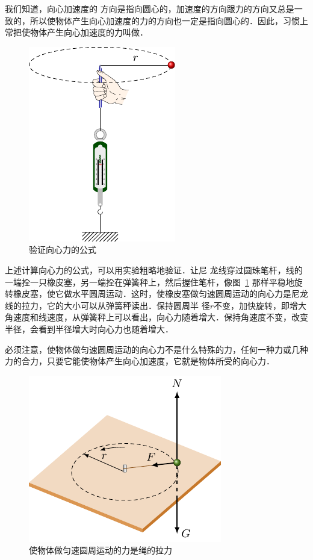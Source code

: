 我们知道，向心加速度的
方向是指向圆心的，加速度的方向跟力的方向又总是一致的，所以使物体产生向心加速度的力的方向也一定是指向圆心的．因此，习惯上常把使物体产生向心加速度的力叫做．

\begin{figure}[htbp]
    \centering
    \includegraphics{fig/A/4-20.pdf}
    \caption{验证向心力的公式}\label{fig_A_4-20}
\end{figure}


上述计算向心力的公式，可以用实验粗略地验证．让尼
龙线穿过圆珠笔杆，线的一端拴一只橡皮塞，另一端拴在弹簧秤上，然后握住笔杆，像图~\ref{fig_A_4-20} 那样平稳地旋转橡皮塞，使它做水平圆周运动．这时，使橡皮塞做匀速圆周运动的向心力是尼龙线的拉力，它的大小可以从弹簧秤读出．保持圆周半
径$r$不变，加快旋转，即增大角速度和线速度，从弹簧秤上可以看出，向心力随着增大．保持角速度不变，改变半径，会看到半径增大时向心力也随着增大．

必须注意，使物体做匀速圆周运动的向心力不是什么特殊的力，任何一种力或几种力的合力，只要它能使物体产生向心加速度，它就是物体所受的向心力．
\begin{figure}[htbp]
    \centering
    \includegraphics{fig/A/4-21.pdf}
    \caption{使物体做匀速圆周运动的力是绳的拉力}\label{fig_A_4-21}
\end{figure}

